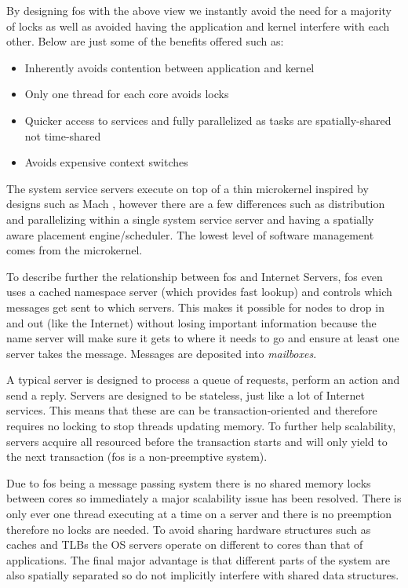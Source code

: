 \documentclass[journal]{IEEEtran}
\begin{document}
\vspace{5 mm}

By designing fos with the above view we instantly avoid the need for a majority of locks as well as avoided having the application and kernel interfere with each other. Below are just some of the benefits offered such as:

\vspace{2 mm}

\begin{itemize}
\item Inherently avoids contention between application and kernel
\item Only one thread for each core avoids locks
\item Quicker access to services and fully parallelized as tasks are spatially-shared not time-shared
\item Avoids expensive context switches
\end{itemize}

\vspace{5 mm}

The system service servers execute on top of a thin microkernel inspired by designs such as Mach \cite{Mach}, however there are a few differences such as distribution and parallelizing within a single system service server and having a spatially aware placement engine/scheduler. The lowest level of software management comes from the microkernel.

To describe further the relationship between fos and Internet Servers, fos even uses a cached namespace server (which provides fast lookup) and controls which messages get sent to which servers. This makes it possible for nodes to drop in and out (like the Internet) without losing important information because the name server will make sure it gets to where it needs to go and ensure at least one server takes the message. Messages are deposited into \emph{mailboxes}.

A typical server is designed to process a queue of requests, perform an action and send a reply. Servers are designed to be stateless, just like a lot of Internet services. This means that these are can be transaction-oriented and therefore requires no locking to stop threads updating memory. To further help scalability, servers acquire all resourced before the transaction starts and will only yield to the next transaction (fos is a non-preemptive system).

Due to fos being a message passing system there is no shared memory locks between cores so immediately a major scalability issue has been resolved. There is only ever one thread executing at a time on a server and there is no preemption therefore no locks are needed. To avoid sharing hardware structures such as caches and TLBs the OS servers operate on different to cores than that of applications. The final major advantage is that different parts of the system are also spatially separated so do not implicitly interfere with shared data structures.  
\end{document}
